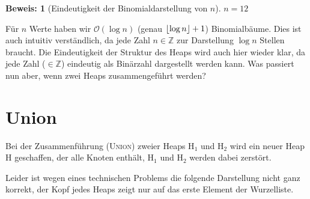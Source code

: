 \documentclass[ngerman,draft,parskip=half*,twoside]{scrreprt}
\theoremstyle{break}
\theoremstyle{nonumberbreak}
\newtheorem{beweis}{Beweis:}
\newcommand*{\OO}{\mathcal{O}}      %
\newcommand*{\Z}{\mathbb{Z}}        %
\DeclarePairedDelimiter{\floor}{\lfloor}{\rfloor}
\begin{document}
\begin{beweis}[Eindeutigkeit der Binomialdarstellung von $n$]
$n=12$ 
\end{beweis} 

\begin{figure}[H]
  \centering
   
  
  \end{figure}
  
Für $n$ Werte haben wir $\OO(\log n)$ (genau $\floor{ \log n } +1$) Binomialbäume. Dies ist auch intuitiv
verständlich, da jede Zahl $n \in \Z$ zur Darstellung $\log n$ Stellen braucht. Die Eindeutigkeit der Struktur
des Heaps wird auch hier wieder klar, da jede Zahl ($\in \Z$) eindeutig als Binärzahl dargestellt werden kann.
Was passiert nun aber, wenn zwei Heaps zusammengeführt werden?

\section{Union}
Bei der Zusammenführung (\textsc{Union}) zweier Heaps H$_1$ und H$_2$ wird ein neuer Heap H geschaffen, der alle Knoten
enthält, H$_1$ und H$_2$ werden dabei zerstört.

%   
%  

Leider ist wegen eines technischen Problems die folgende Darstellung nicht ganz korrekt, der Kopf jedes Heaps zeigt nur
auf das erste Element der Wurzelliste.
\end{document}
